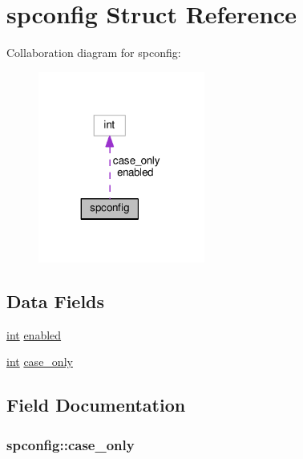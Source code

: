 \hypertarget{structspconfig}{}\section{spconfig Struct Reference}
\label{structspconfig}


Collaboration diagram for spconfig\+:
\nopagebreak
\begin{figure}[H]
\begin{center}
\leavevmode
\includegraphics[width=155pt]{structspconfig__coll__graph}
\end{center}
\end{figure}
\subsection*{Data Fields}
\begin{DoxyCompactItemize}
\item 
\hyperlink{pcre_8txt_a42dfa4ff673c82d8efe7144098fbc198}{int} \hyperlink{structspconfig_a516efd22fe1a4e574c99a19b0f5bb09b}{enabled}
\item 
\hyperlink{pcre_8txt_a42dfa4ff673c82d8efe7144098fbc198}{int} \hyperlink{structspconfig_a746cbb911f4ba114cd6d051ccdb6eb96}{case\+\_\+only}
\end{DoxyCompactItemize}


\subsection{Field Documentation}
\subsubsection[{\texorpdfstring{case\+\_\+only}{case_only}}]{ spconfig\+::case\+\_\+only}\hypertarget{structspconfig_a746cbb911f4ba114cd6d051ccdb6eb96}{}\label{structspconfig_a746cbb911f4ba114cd6d051ccdb6eb96}
